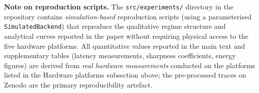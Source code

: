 \textbf{Note on reproduction scripts.}
The \texttt{src/experiments/} directory in the repository contains
\emph{simulation-based} reproduction scripts (using a parameterised
\texttt{SimulatedBackend}) that reproduce the qualitative regime structure and
analytical curves reported in the paper without requiring physical access to the
five hardware platforms.
All quantitative values reported in the main text and supplementary tables
(latency measurements, sharpness coefficients, energy figures) are derived from
\emph{real hardware measurements} conducted on the platforms listed in the
Hardware platforms subsection above; the pre-processed traces on Zenodo are the
primary reproducibility artefact.
